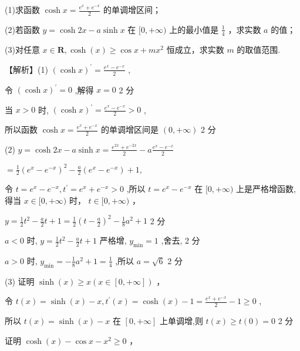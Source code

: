 \documentclass[10pt]{article}
\newcommand*\circled[1]{\tikz[baseline=(char.base)]{\node[shape=circle,draw,inner sep=1.5pt] (char) {\small #1};}}
\begin{document}
(1)求函数 \(\cosh x = \frac{{e}^{x} + {e}^{-x}}{2}\) 的单调增区间；

(2)若函数 \(y = \cosh {2x} - a\sinh x\) 在 \(\lbrack 0, + \infty )\) 上的最小值是 \(\frac{1}{4}\) ，求实数 \(a\) 的值；

(3)对任意 \(x \in  \mathbf{R},\cosh \left( x\right)  \geq  \cos x + m{x}^{2}\) 恒成立，求实数 \(m\) 的取值范围.

【解析】(1) \({\left( \cosh x\right) }^{\prime } = \frac{{e}^{x} - {e}^{-x}}{2}\) ,

令 \({\left( \cosh x\right) }^{\prime } = 0\) ,解得 \(x = 0\) 2 分

当 \(x > 0\) 时, \({\left( \cosh x\right) }^{\prime } = \frac{{e}^{x} - {e}^{-x}}{2} > 0\) ,

所以函数 \(\cosh x = \frac{{e}^{x} + {e}^{-x}}{2}\) 的单调增区间是 \(\left( {0, + \infty }\right)\) 2 分

(2) \(y = \cosh {2x} - a\sinh x = \frac{{e}^{2x} + {e}^{-{2x}}}{2} - a\frac{{e}^{x} - {e}^{-x}}{2}\)

\(= \frac{1}{2}{\left( {e}^{x} - {e}^{-x}\right) }^{2} - \frac{a}{2}\left( {{e}^{x} - {e}^{-x}}\right)  + 1,\)

令 \(t = {e}^{x} - {e}^{-x},{t}^{\prime } = {e}^{x} + {e}^{-x} > 0\) ,所以 \(t = {e}^{x} - {e}^{-x}\) 在 \(\lbrack 0, + \infty )\) 上是严格增函数, 得当 \(x \in  \lbrack 0, + \infty )\) 时， \(t \in  \lbrack 0, + \infty )\) ，

\(y = \frac{1}{2}{t}^{2} - \frac{a}{2}t + 1 = \frac{1}{2}{\left( t - \frac{a}{2}\right) }^{2} - \frac{1}{8}{a}^{2} + 1\) 2 分

\(a < 0\) 时, \(y = \frac{1}{2}{t}^{2} - \frac{a}{2}t + 1\) 严格增, \({y}_{\min } = 1\) ,舍去, 2 分

\(a > 0\) 时, \({y}_{\min } =  - \frac{1}{8}{a}^{2} + 1 = \frac{1}{4}\) ,所以 \(a = \sqrt{6}\) 2 分

(3) \circled{1} 证明 \(\sinh \left( x\right)  \geq  x\left( {x \in  \left\lbrack  {0, + \infty }\right\rbrack  }\right)\) ，

令 \(t\left( x\right)  = \sinh \left( x\right)  - x,{t}^{\prime }\left( x\right)  = \cosh \left( x\right)  - 1 = \frac{{e}^{x} + {e}^{-x}}{2} - 1 \geq  0\) ,

所以 \(t\left( x\right)  = \sinh \left( x\right)  - x\) 在 \(\left\lbrack  {0, + \infty }\right\rbrack\) 上单调增,则 \(t\left( x\right)  \geq  t\left( 0\right)  = 0\) 2 分

 \circled{2}  证明 \(\cosh \left( x\right)  - \cos x - {x}^{2} \geq  0\) ，
\end{document}
